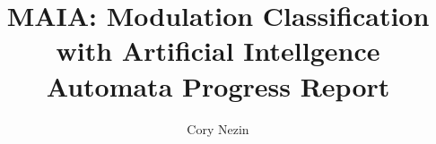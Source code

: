 \documentclass[12pt]{article}
\begin{document}
\title{MAIA: Modulation Classification with Artificial Intellgence Automata Progress Report}
\author{Cory Nezin}
\maketitle
%
%

\end{document}
